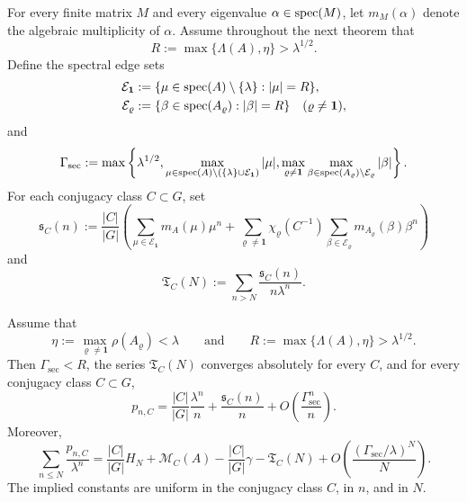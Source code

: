 For every finite matrix \(M\) and every eigenvalue
\(\alpha\in\operatorname{spec}(M)\), let \(m_M(\alpha)\) denote the algebraic
multiplicity of \(\alpha\). Assume throughout the next theorem that
\[
  R:=\max\{\Lambda(A),\eta\}>\lambda^{1/2}.
\]
Define the spectral edge sets
\[
  \begin{aligned}
    \mathcal E_{\mathbf 1}
    &:=\{\mu\in\operatorname{spec}(A)\setminus\{\lambda\}:|\mu|=R\}, \\
    \mathcal E_\varrho
    &:=\{\beta\in\operatorname{spec}(A_\varrho):|\beta|=R\}
    \quad (\varrho\neq\mathbf 1),
  \end{aligned}
\]
and
\[
  \Gamma_{\mathrm{sec}}
  :=
  \max\left\{
    \lambda^{1/2},
    \max_{\mu\in\operatorname{spec}(A)\setminus(\{\lambda\}\cup\mathcal E_{\mathbf 1})}
      |\mu|,
    \max_{\varrho\neq\mathbf 1}
      \max_{\beta\in\operatorname{spec}(A_\varrho)\setminus\mathcal E_\varrho}
        |\beta|
  \right\}.
\]
For each conjugacy class \(C\subset G\), set
\begin{equation}\label{eq:class-secondary-profile}
  \mathfrak s_C(n)
  :=
  \frac{|C|}{|G|}
  \left(
    \sum_{\mu\in\mathcal E_{\mathbf 1}}m_A(\mu)\mu^n
    +
    \sum_{\varrho\neq\mathbf 1}\chi_\varrho(C^{-1})
      \sum_{\beta\in\mathcal E_\varrho}m_{A_\varrho}(\beta)\beta^n
  \right)
\end{equation}
and
\begin{equation}\label{eq:class-secondary-tail}
  \mathfrak T_C(N)
  :=
  \sum_{n>N}\frac{\mathfrak s_C(n)}{n\lambda^n}.
\end{equation}

\begin{theorem}
  \label{thm:class-mertens-secondary-term}
  Assume that
  \[
    \eta:=\max_{\varrho\neq\mathbf 1}\rho(A_\varrho)<\lambda
    \qquad\text{and}\qquad
    R:=\max\{\Lambda(A),\eta\}>\lambda^{1/2}.
  \]
  Then \(\Gamma_{\mathrm{sec}}<R\), the series
  \(\mathfrak T_C(N)\) converges absolutely for every \(C\), and for
  every conjugacy class \(C\subset G\),
  \begin{equation}\label{eq:class-secondary-pointwise}
    p_{n,C}
    =
    \frac{|C|}{|G|}\frac{\lambda^n}{n}
    +\frac{\mathfrak s_C(n)}{n}
    +O\!\left(\frac{\Gamma_{\mathrm{sec}}^n}{n}\right).
  \end{equation}
  Moreover,
  \begin{equation}\label{eq:class-secondary-harmonic}
    \sum_{n\le N}\frac{p_{n,C}}{\lambda^n}
    =
    \frac{|C|}{|G|}H_N
    +\mathcal M_C(A)-\frac{|C|}{|G|}\gamma
    -\mathfrak T_C(N)
    +O\!\left(\frac{(\Gamma_{\mathrm{sec}}/\lambda)^N}{N}\right).
  \end{equation}
  The implied constants are uniform in the conjugacy class \(C\), in
  \(n\), and in \(N\).
\end{theorem}

